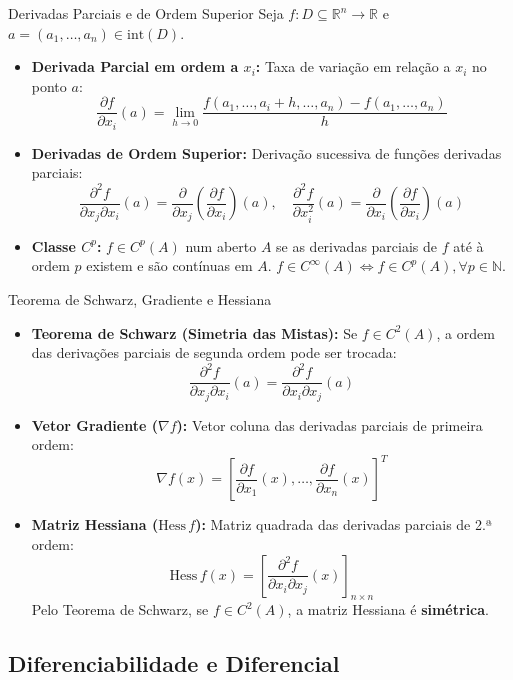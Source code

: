 \documentclass[11pt,a4paper]{article}
\newcommand{\R}{\mathbb{R}}
\newcommand{\N}{\mathbb{N}}
\begin{document}
\noindent\begin{definitionbox}{Derivadas Parciais e de Ordem Superior}
  Seja $f : D \subseteq \R^n \to \R$ e $a = (a_1, \dots, a_n) \in \text{int}(D)$.
  \begin{itemize}
    \item \textbf{Derivada Parcial em ordem a $x_i$:} Taxa de variação em relação a $x_i$ no ponto $a$:
      \[ \frac{\partial f}{\partial x_i}(a) = \lim_{h\to 0} \frac{f(a_1, \dots, a_i+h, \dots, a_n) - f(a_1, \dots, a_n)}{h} \]
    \item \textbf{Derivadas de Ordem Superior:} Derivação sucessiva de funções derivadas parciais:
      \[ \frac{\partial^2 f}{\partial x_j \partial x_i}(a) = \frac{\partial}{\partial x_j} \left( \frac{\partial f}{\partial x_i} \right) (a), \quad \frac{\partial^2 f}{\partial x_i^2}(a) = \frac{\partial}{\partial x_i} \left( \frac{\partial f}{\partial x_i} \right) (a) \]
    \item \textbf{Classe $C^p$:} $f \in C^p(A)$ num aberto $A$ se as derivadas parciais de $f$ até à ordem $p$ existem e são contínuas em $A$. $f \in C^\infty(A) \iff f \in C^p(A), \forall p \in \N$.
  \end{itemize}
\end{definitionbox}

\noindent\begin{theorembox}{Teorema de Schwarz, Gradiente e Hessiana}
  \begin{itemize}
    \item \textbf{Teorema de Schwarz (Simetria das Mistas):} Se $f \in C^2(A)$, a ordem das derivações parciais de segunda ordem pode ser trocada:
      \[ \frac{\partial^2 f}{\partial x_j \partial x_i}(a) = \frac{\partial^2 f}{\partial x_i \partial x_j}(a) \]
    \item \textbf{Vetor Gradiente ($\nabla f$):} Vetor coluna das derivadas parciais de primeira ordem:
      \[ \nabla f(x) = \left[ \frac{\partial f}{\partial x_1}(x), \dots, \frac{\partial f}{\partial x_n}(x) \right]^T \]
    \item \textbf{Matriz Hessiana ($\text{Hess}\,f$):} Matriz quadrada das derivadas parciais de 2.ª ordem:
      \[ \text{Hess}\,f(x) = \left[ \frac{\partial^2 f}{\partial x_i \partial x_j}(x) \right]_{n \times n} \]
      Pelo Teorema de Schwarz, se $f \in C^2(A)$, a matriz Hessiana é \textbf{simétrica}.
  \end{itemize}
\end{theorembox}

\subsection{Diferenciabilidade e Diferencial}
\end{document}
